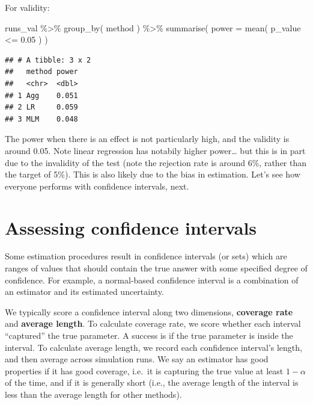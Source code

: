 \documentclass[
]{book}
\newenvironment{Shaded}{\begin{snugshade}}{\end{snugshade}}
\newcommand{\AttributeTok}[1]{\textcolor[rgb]{0.77,0.63,0.00}{#1}}
\newcommand{\FloatTok}[1]{\textcolor[rgb]{0.00,0.00,0.81}{#1}}
\newcommand{\FunctionTok}[1]{\textcolor[rgb]{0.00,0.00,0.00}{#1}}
\newcommand{\NormalTok}[1]{#1}
\newcommand{\SpecialCharTok}[1]{\textcolor[rgb]{0.00,0.00,0.00}{#1}}
\begin{document}
For validity:

\begin{Shaded}
\begin{Highlighting}[]
\NormalTok{runs\_val }\SpecialCharTok{\%\textgreater{}\%} \FunctionTok{group\_by}\NormalTok{( method ) }\SpecialCharTok{\%\textgreater{}\%}
  \FunctionTok{summarise}\NormalTok{( }\AttributeTok{power =} \FunctionTok{mean}\NormalTok{( p\_value }\SpecialCharTok{\textless{}=} \FloatTok{0.05}\NormalTok{ ) )}
\end{Highlighting}
\end{Shaded}

\begin{verbatim}
## # A tibble: 3 x 2
##   method power
##   <chr>  <dbl>
## 1 Agg    0.051
## 2 LR     0.059
## 3 MLM    0.048
\end{verbatim}

The power when there is an effect is not particularly high, and the validity is around 0.05.
Note linear regression has notabily higher power\ldots{} but this is in part due to the invalidity of the test (note the rejection rate is around 6\%, rather than the target of 5\%).
This is also likely due to the bias in estimation.
Let's see how everyone performs with confidence intervals, next.

\hypertarget{assessing-confidence-intervals}{%
\section{Assessing confidence intervals}\label{assessing-confidence-intervals}}

Some estimation procedures result in confidence intervals (or sets) which are ranges of values that should contain the true answer with some specified degree of confidence.
For example, a normal-based confidence interval is a combination of an estimator and its estimated uncertainty.

We typically score a confidence interval along two dimensions, \textbf{coverage rate} and \textbf{average length}.
To calculate coverage rate, we score whether each interval ``captured'' the true parameter.
A success is if the true parameter is inside the interval.
To calculate average length, we record each confidence interval's length, and then average across simulation runs.
We say an estimator has good properties if it has good coverage, i.e.~it is capturing the true value at least \(1-\alpha\) of the time, and if it is generally short (i.e., the average length of the interval is less than the average length for other methods).
\end{document}

